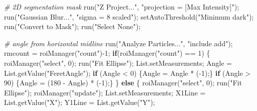 \documentclass[10pt, b5paper, singlespacinge, twoside]{reedthesis} %
\newenvironment{Shaded}{}{}
\newcommand{\CommentTok}[1]{\textit{#1}}
\newcommand{\ControlFlowTok}[1]{\textbf{#1}}
\newcommand{\DecValTok}[1]{#1}
\newcommand{\FunctionTok}[1]{#1}
\newcommand{\NormalTok}[1]{#1}
\newcommand{\OtherTok}[1]{#1}
\newcommand{\SpecialCharTok}[1]{#1}
\newcommand{\StringTok}[1]{#1}
\theoremstyle{definition}
\theoremstyle{definition}
\theoremstyle{definition}
\theoremstyle{remark}
\begin{document}
\scriptsize
\begin{Shaded}
\begin{Highlighting}[numbers=left,,]
\CommentTok{\# 2D segmentation mask}
  \FunctionTok{run}\NormalTok{(}\StringTok{"Z Project..."}\NormalTok{, }\StringTok{"projection = [Max Intensity]"}\NormalTok{);}
    \FunctionTok{run}\NormalTok{(}\StringTok{"Gaussian Blur..."}\NormalTok{, }\StringTok{"sigma = 8 scaled"}\NormalTok{);}
    \FunctionTok{setAutoThreshold}\NormalTok{(}\StringTok{"Minimum dark"}\NormalTok{);}
    \FunctionTok{run}\NormalTok{(}\StringTok{"Convert to Mask"}\NormalTok{);}
    \FunctionTok{run}\NormalTok{(}\StringTok{"Select None"}\NormalTok{);}

\CommentTok{\# angle from horizontal midline}
    \FunctionTok{run}\NormalTok{(}\StringTok{"Analyze Particles..."}\NormalTok{, }\StringTok{"include add"}\NormalTok{);}
\NormalTok{    rmcount }\OtherTok{=} \FunctionTok{roiManager}\NormalTok{(}\StringTok{"count"}\NormalTok{)}\SpecialCharTok{{-}}\DecValTok{1}\NormalTok{;}
    \ControlFlowTok{if}\NormalTok{(}\FunctionTok{roiManager}\NormalTok{(}\StringTok{"count"}\NormalTok{) }\SpecialCharTok{==} \DecValTok{1}\NormalTok{) \{}
        \FunctionTok{roiManager}\NormalTok{(}\StringTok{"select"}\NormalTok{, }\DecValTok{0}\NormalTok{);}
        \FunctionTok{run}\NormalTok{(}\StringTok{"Fit Ellipse"}\NormalTok{);}
\NormalTok{        List.setMeasurements;}
\NormalTok{        Angle }\OtherTok{=} \FunctionTok{List.getValue}\NormalTok{(}\StringTok{"FeretAngle"}\NormalTok{);}
        \ControlFlowTok{if}\NormalTok{ (Angle }\SpecialCharTok{\textless{}} \DecValTok{0}\NormalTok{) \{Angle }\OtherTok{=}\NormalTok{ Angle }\SpecialCharTok{*}\NormalTok{ (}\SpecialCharTok{{-}}\DecValTok{1}\NormalTok{);\}}
        \ControlFlowTok{if}\NormalTok{ (Angle }\SpecialCharTok{\textgreater{}} \DecValTok{90}\NormalTok{) \{Angle }\OtherTok{=}\NormalTok{ (}\DecValTok{180} \SpecialCharTok{{-}}\NormalTok{ Angle) }\SpecialCharTok{*}\NormalTok{ (}\SpecialCharTok{{-}}\DecValTok{1}\NormalTok{);\}}
\NormalTok{    \} }\ControlFlowTok{else}\NormalTok{ \{}
        \FunctionTok{roiManager}\NormalTok{(}\StringTok{"select"}\NormalTok{, }\DecValTok{0}\NormalTok{);}
        \FunctionTok{run}\NormalTok{(}\StringTok{"Fit Ellipse"}\NormalTok{);}
        \FunctionTok{roiManager}\NormalTok{(}\StringTok{"update"}\NormalTok{);}
\NormalTok{        List.setMeasurements;}
\NormalTok{        X1Line }\OtherTok{=} \FunctionTok{List.getValue}\NormalTok{(}\StringTok{"X"}\NormalTok{);}
\NormalTok{        Y1Line }\OtherTok{=} \FunctionTok{List.getValue}\NormalTok{(}\StringTok{"Y"}\NormalTok{);}

\end{Highlighting}
\end{Shaded}
\end{document}
